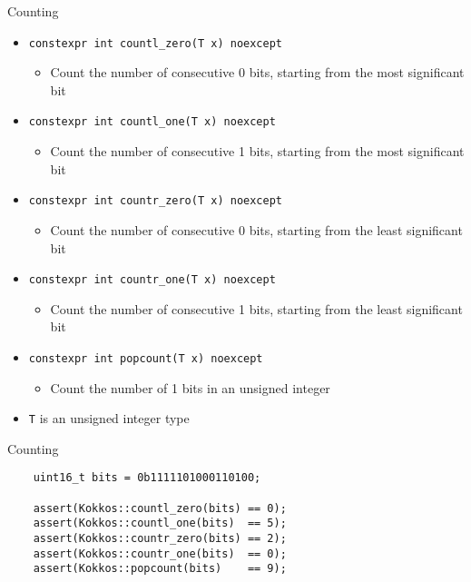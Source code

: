 \begin{frame}[fragile]{Counting}
	\begin{itemize}
		\item \texttt{constexpr int countl\_zero(T x) noexcept}
		      \begin {itemize}
		\item Count the number of consecutive 0 bits, starting from the most significant bit
	\end{itemize}
	\item \texttt{constexpr int countl\_one(T x) noexcept}
	\begin {itemize}
	\item Count the number of consecutive 1 bits, starting from the most significant bit
	\end{itemize}
	\item \texttt{constexpr int countr\_zero(T x) noexcept}
	\begin {itemize}
	\item Count the number of consecutive 0 bits, starting from the least significant bit
	\end{itemize}
	\item \texttt{constexpr int countr\_one(T x) noexcept}
	\begin {itemize}
	\item Count the number of consecutive 1 bits, starting from the least significant bit
	\end{itemize}
	\item \texttt{constexpr int popcount(T x) noexcept}
	\begin {itemize}
	\item Count the number of 1 bits in an unsigned integer
	\end{itemize}
	\vfill
	\item \texttt{T} is an unsigned integer type
	\end{itemize}
\end{frame}


\begin{frame}[fragile]{Counting}
	\lstset {language=C++}
	\begin{lstlisting}
    uint16_t bits = 0b1111101000110100;

    assert(Kokkos::countl_zero(bits) == 0);
    assert(Kokkos::countl_one(bits)  == 5);
    assert(Kokkos::countr_zero(bits) == 2);
    assert(Kokkos::countr_one(bits)  == 0);
    assert(Kokkos::popcount(bits)    == 9);
	\end{lstlisting}
\end{frame}

